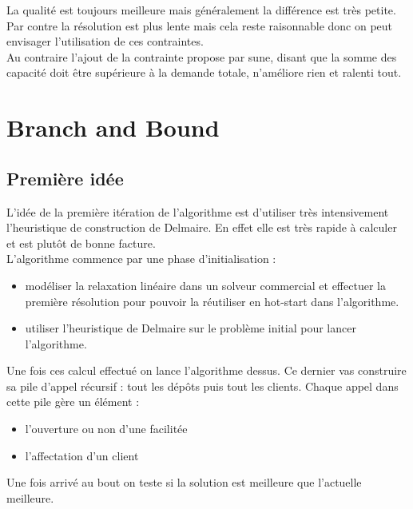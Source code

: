 \documentclass[12pt,a4paper]{article}
\begin{document}
La qualité est toujours meilleure mais généralement la différence est très petite. Par contre la résolution est plus lente mais cela reste raisonnable donc on peut envisager l'utilisation de ces contraintes.\\

Au contraire l'ajout de la contrainte propose par sune, disant que la somme des capacité doit être supérieure à la demande totale, n’améliore rien et ralenti tout.

\section{Branch and Bound}

\subsection{Première idée}

L'idée de la première itération de l'algorithme est d'utiliser très intensivement l'heuristique de construction de Delmaire. En effet elle est très rapide à calculer et est plutôt de bonne facture.\\

L'algorithme commence par une phase d'initialisation :
\begin{itemize}
\item
modéliser la relaxation linéaire dans un solveur commercial et effectuer la première résolution pour pouvoir la réutiliser en hot-start dans l'algorithme.
\item
utiliser l'heuristique de Delmaire sur le problème initial pour lancer l'algorithme.
\end{itemize}

Une fois ces calcul effectué on lance l'algorithme dessus. Ce dernier vas construire sa pile d'appel récursif : tout les dépôts puis tout les clients. Chaque appel dans cette pile gère un élément : 
\begin{itemize}
\item
l'ouverture ou non d'une facilitée
\item
l'affectation d'un client
\end{itemize}
Une fois arrivé au bout on teste si la solution est meilleure que l'actuelle meilleure.\\
\end{document}
